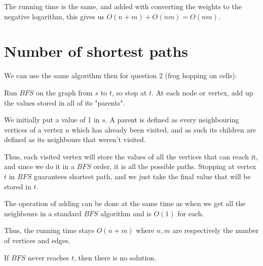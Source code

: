 \documentclass[11pt,letterpaper]{article}
\begin{document}
		The running time is the same, and added with converting the weights to the negative logarithm, this gives us $O(n+m) + O(nm) = O(nm)$.
	
	\section{Number of shortest paths}
		We can use the same algorithm then for question 2 (frog hopping on cells):
		
		Run $BFS$ on the graph from $s$ to $t$, so stop at $t$.
		At each node or vertex, add up the values stored in all of its "parents".
		
		We initially put a value of 1 in $s$.
		A parent is defined as every neighbouring vertices of a vertex $u$ which has already been visited, and as such its children are defined as its neighbours that weren't visited.
		
		Thus, each visited vertex will store the values of all the vertices that can reach it, and since we do it in a $BFS$ order, it is all the possible paths.
		Stopping at vertex $t$ in $BFS$ guarantees shortest path, and we just take the final value that will be stored in $t$.
		
		The operation of adding can be done at the same time as when we get all the neighbours in a standard $BFS$ algorithm and is $O(1)$ for each.
		
		Thus, the running time stays $O(n + m)$ where $n, m$ are respectively the number of vertices and edges.
		
		If $BFS$ never reaches $t$, then there is no solution.
	
\end{document}
